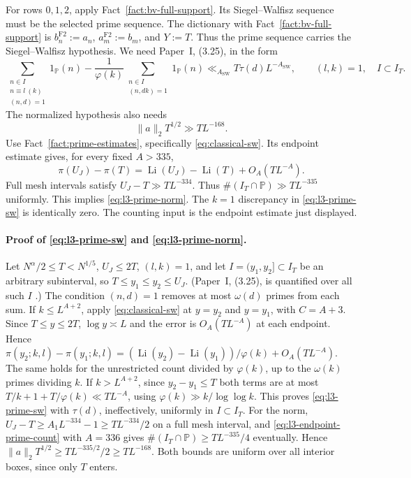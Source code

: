 For rows $0,1,2$, apply Fact~\ref{fact:bv-full-support}.
Its Siegel--Walfisz sequence must be the selected prime sequence.
The dictionary with Fact~\ref{fact:bv-full-support} is
$b_n^{\mathrm{F2}}:=a_n$, $a_m^{\mathrm{F2}}:=b_m$, and $Y:=T$.
Thus the prime sequence carries the Siegel--Walfisz hypothesis.
We need Paper~I, (3.25), in the form
\begin{equation}\label{eq:l3-prime-sw}
 \sum_{\substack{n\in I\\n\equiv l\ (k)\\(n,d)=1}}1_{\mathbb P}(n)
 -\frac1{\varphi(k)}\sum_{\substack{n\in I\\(n,dk)=1}}1_{\mathbb P}(n)
 \ll_{A_{\mathrm{SW}}}T\tau(d)L^{-A_{\mathrm{SW}}},\qquad(l,k)=1,
 \quad I\subset I_T.
\end{equation}
The normalized hypothesis also needs
\begin{equation}\label{eq:l3-prime-norm}
 \|a\|_2T^{1/2}\gg T L^{-168}.
\end{equation}
Use Fact~\ref{fact:prime-estimates}, specifically \eqref{eq:classical-sw}.
Its endpoint estimate gives, for every fixed $A>335$,
\begin{equation}\label{eq:l3-endpoint-prime-count}
 \pi(U_J)-\pi(T)=\operatorname{Li}(U_J)-\operatorname{Li}(T)
                         +O_A(TL^{-A}).
\end{equation}
Full mesh intervals satisfy $U_J-T\gg TL^{-334}$.
Thus $\#(I_T\cap\mathbb P)\gg TL^{-335}$ uniformly.
This implies \eqref{eq:l3-prime-norm}.
The $k=1$ discrepancy in \eqref{eq:l3-prime-sw} is identically zero.
The counting input is the endpoint estimate just displayed.
\paragraph{Proof of \eqref{eq:l3-prime-sw} and \eqref{eq:l3-prime-norm}.}
Let $N^\alpha/2\le T<N^{1/5}$, $U_J\le2T$, $(l,k)=1$, and let
$I=(y_1,y_2]\subset I_T$ be an arbitrary subinterval, so
$T\le y_1\le y_2\le U_J$. (Paper~I, (3.25), is quantified over all
such $I$ \cite[(3.25)]{PaperI}.)
The condition $(n,d)=1$ removes at most $\omega(d)$ primes from each sum.
If $k\le L^{A+2}$, apply \eqref{eq:classical-sw} at $y=y_2$ and $y=y_1$,
with $C=A+3$. Since $T\le y\le2T$, $\log y\asymp L$ and the error is
$O_A(TL^{-A})$ at each endpoint. Hence
$\pi(y_2;k,l)-\pi(y_1;k,l)=(\operatorname{Li}(y_2)-\operatorname{Li}(y_1))/\varphi(k)+O_A(TL^{-A})$.
The same holds for the unrestricted count divided by $\varphi(k)$,
up to the $\omega(k)$ primes dividing $k$.
If $k>L^{A+2}$, since $y_2-y_1\le T$ both terms are at most
$T/k+1+T/\varphi(k)\ll TL^{-A}$,
using $\varphi(k)\gg k/\log\log k$. This proves \eqref{eq:l3-prime-sw}
with $\tau(d)$, ineffectively, uniformly in $I\subset I_T$. For the norm,
$U_J-T\ge A_1L^{-334}-1\ge TL^{-334}/2$ on a full mesh interval, and
\eqref{eq:l3-endpoint-prime-count} with $A=336$ gives
$\#(I_T\cap\mathbb P)\ge TL^{-335}/4$ eventually. Hence
$\|a\|_2T^{1/2}\ge TL^{-335/2}/2\ge TL^{-168}$. Both bounds are uniform
over all interior boxes, since only $T$ enters.

